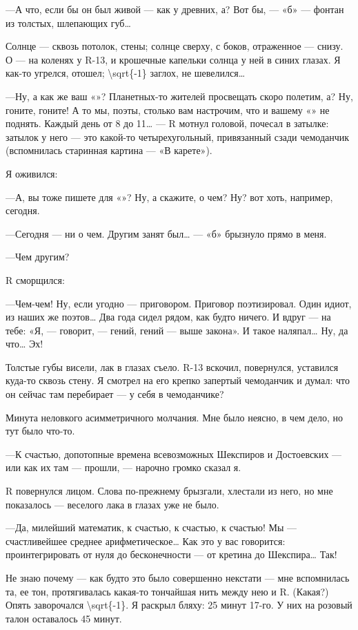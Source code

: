 \documentclass[11pt,openany]{book}
\begin{document}
---А что, если бы он был живой --- как у древних, а? Вот бы, --- «б» --- фонтан из толстых, шлепающих губ\ldots{}

Солнце --- сквозь потолок, стены; солнце сверху, с боков, отраженное --- снизу. О --- на коленях у R-13, и крошечные капельки солнца у ней в синих глазах. Я как-то угрелся, отошел; \textbackslash{}sqrt\{-1\} заглох, не шевелился\ldots{}

---Ну, а как же ваш «»? Планетных-то жителей просвещать скоро полетим, а? Ну, гоните, гоните! А то мы, поэты, столько вам настрочим, что и вашему «» не поднять. Каждый день от 8 до 11\ldots{} --- R мотнул головой, почесал в затылке: затылок у него --- это какой-то четырехугольный, привязанный сзади чемоданчик (вспомнилась старинная картина --- «В карете»).

Я оживился:

---А, вы тоже пишете для «»? Ну, а скажите, о чем? Ну? вот хоть, например, сегодня.

---Сегодня --- ни о чем. Другим занят был\ldots{} --- «б» брызнуло прямо в меня.

---Чем другим?

R сморщился:

---Чем-чем! Ну, если угодно --- приговором. Приговор поэтизировал. Один идиот, из наших же поэтов\ldots{} Два года сидел рядом, как будто ничего. И вдруг --- на тебе: «Я, --- говорит, --- гений, гений --- выше закона». И такое наляпал\ldots{} Ну, да что\ldots{} Эх!

Толстые губы висели, лак в глазах съело. R-13 вскочил, повернулся, уставился куда-то сквозь стену. Я смотрел на его крепко запертый чемоданчик и думал: что он сейчас там перебирает --- у себя в чемоданчике?

Минута неловкого асимметричного молчания. Мне было неясно, в чем дело, но тут было что-то.

---К счастью, допотопные времена всевозможных Шекспиров и Достоевских --- или как их там --- прошли, --- нарочно громко сказал я.

R повернулся лицом. Слова по-прежнему брызгали, хлестали из него, но мне показалось --- веселого лака в глазах уже не было.

---Да, милейший математик, к счастью, к счастью, к счастью! Мы --- счастливейшее среднее арифметическое\ldots{} Как это у вас говорится: проинтегрировать от нуля до бесконечности --- от кретина до Шекспира\ldots{} Так!

Не знаю почему --- как будто это было совершенно некстати --- мне вспомнилась та, ее тон, протягивалась какая-то тончайшая нить между нею и R. (Какая?) Опять заворочался \textbackslash{}sqrt\{-1\}. Я раскрыл бляху: 25 минут 17-го. У них на розовый талон оставалось 45 минут.
\end{document}
